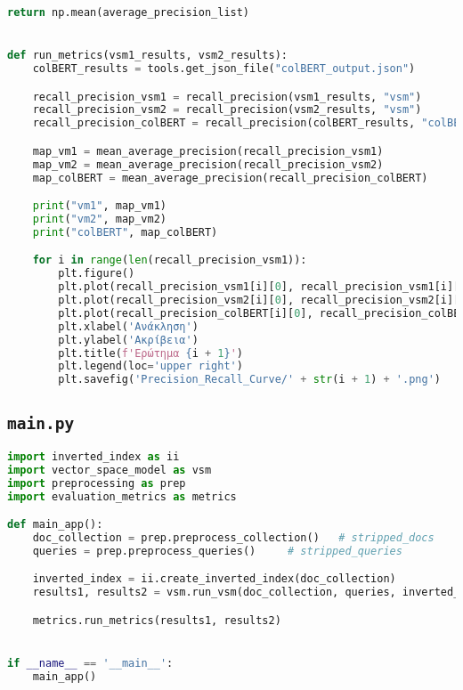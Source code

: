 \begin{lstlisting}[language=Python]
    return np.mean(average_precision_list)


def run_metrics(vsm1_results, vsm2_results):
    colBERT_results = tools.get_json_file("colBERT_output.json")

    recall_precision_vsm1 = recall_precision(vsm1_results, "vsm")
    recall_precision_vsm2 = recall_precision(vsm2_results, "vsm")
    recall_precision_colBERT = recall_precision(colBERT_results, "colBERT")

    map_vm1 = mean_average_precision(recall_precision_vsm1)
    map_vm2 = mean_average_precision(recall_precision_vsm2)
    map_colBERT = mean_average_precision(recall_precision_colBERT)

    print("vm1", map_vm1)
    print("vm2", map_vm2)
    print("colBERT", map_colBERT)

    for i in range(len(recall_precision_vsm1)):
        plt.figure()
        plt.plot(recall_precision_vsm1[i][0], recall_precision_vsm1[i][1], label="VSM 1")
        plt.plot(recall_precision_vsm2[i][0], recall_precision_vsm2[i][1], label="VSM 2")
        plt.plot(recall_precision_colBERT[i][0], recall_precision_colBERT[i][1], label="colBERT")
        plt.xlabel('Ανάκληση')
        plt.ylabel('Ακρίβεια')
        plt.title(f'Ερώτημα {i + 1}')
        plt.legend(loc='upper right')
        plt.savefig('Precision_Recall_Curve/' + str(i + 1) + '.png')
\end{lstlisting}


\subsection{\texttt{main.py}}
\begin{lstlisting}[language=Python]
import inverted_index as ii
import vector_space_model as vsm
import preprocessing as prep
import evaluation_metrics as metrics

def main_app():
    doc_collection = prep.preprocess_collection()   # stripped_docs
    queries = prep.preprocess_queries()     # stripped_queries

    inverted_index = ii.create_inverted_index(doc_collection)
    results1, results2 = vsm.run_vsm(doc_collection, queries, inverted_index)

    metrics.run_metrics(results1, results2)


if __name__ == '__main__':
    main_app()

\end{lstlisting}